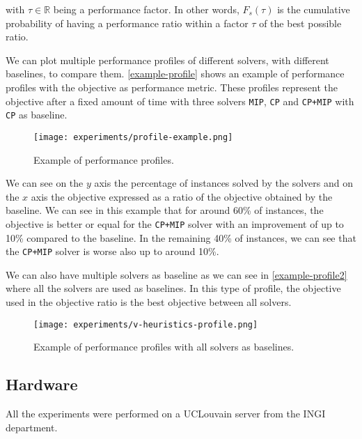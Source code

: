 \documentclass[../../thesis.tex]{subfiles}
\begin{document}
with $\tau \in \mathbb{R}$ being a performance factor. In other words, $F_s(\tau)$ is the cumulative probability
of having a performance ratio within a factor $\tau$ of the best possible ratio.


We can plot multiple performance profiles of different solvers, with different baselines, to compare them.
\autoref{example-profile} shows an example of performance profiles with the objective as performance metric.
These profiles represent the objective after a fixed amount of time 
with three solvers \texttt{MIP}, \texttt{CP} and \texttt{CP+MIP} with \texttt{CP} as baseline.

\begin{figure}
  \centering
  \texttt{[image: experiments/profile-example.png]}
  \caption{Example of performance profiles.}
  \label{example-profile}
\end{figure}

\FloatBarrier

We can see on the $y$ axis the percentage of instances solved by the solvers and on the $x$ axis the objective expressed
as a ratio of the objective obtained by the baseline. We can see in this example that for around 60\% of instances,
the objective is better or equal for the \texttt{CP+MIP} solver with an improvement of up to 10\% compared to the baseline.
In the remaining 40\% of instances, we can see that the \texttt{CP+MIP} solver is worse also up to around 10\%.



We can also have multiple solvers as baseline as we can see in \autoref{example-profile2} where all the solvers 
are used as baselines. In this type of profile, the objective used in the objective ratio is the best objective between all solvers.

\begin{figure}
  \centering
  \texttt{[image: experiments/v-heuristics-profile.png]}
  \caption{Example of performance profiles with all solvers as baselines.}
  \label{example-profile2}
\end{figure}

\FloatBarrier

\subsection{Hardware}

All the experiments were performed on a UCLouvain server \cite{jabba} from the INGI department.
\end{document}
